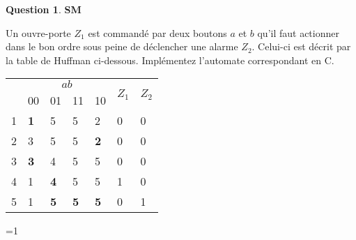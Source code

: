 \documentclass[11pt,a4paper,dvipsnames]{article}
\theoremstyle{definition}%
\newtheorem{Q}{Question}[] %
\newcounter{reponseCnt}
\begin{document}
\begin{Q} \textbf{SM}

	Un ouvre-porte $Z_1$ est commandé par deux boutons $a$ et $b$ qu'il faut actionner dans le bon ordre sous peine de déclencher une alarme $Z_2$.
	Celui-ci est décrit par la table de Huffman ci-dessous.
	Implémentez l'automate correspondant en C.

	\begin{center}
		\begin{tabular}{|l|l|l|l|l|l|l|} \hline
			\multirow{2}{*}{} & \multicolumn{4}{c|}{$ab$} & \multirow{2}{*}{$Z_1$} & \multirow{2}{*}{$Z_2$} \\ \cline{2-5}
			& 00 & 01 & 11 & 10 & & \\ \hline
			1 & \textbf{1} & 5 & 5 & 2 & 0 & 0 \\ \hline
			2 & 3 & 5 & 5 & \textbf{2} & 0 & 0 \\ \hline
			3 & \textbf{3} & 4 & 5 & 5 & 0 & 0 \\ \hline
			4 & 1 & \textbf{4} & 5 & 5 & 1 & 0 \\ \hline
			5 & 1 & \textbf{5} & \textbf{5} & \textbf{5} & 0 & 1 \\ \hline
		\end{tabular}
	\end{center}

\ifnum\value{reponseCnt}=1
\newpage
  
\fi

\end{Q}
\end{document}
